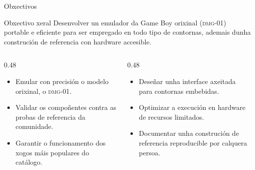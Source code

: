 \begin{frame}{Obxectivos}
  \begin{alertblock}{Obxectivo xeral}
    Desenvolver un emulador da Game Boy orixinal (\textsc{dmg}-01) 
    portable e eficiente para ser empregado en todo tipo de contornas,
    ademais dunha construción de referencia con hardware accesible.
  \end{alertblock}

  \vspace{0.3em}

  \small
  \begin{columns}[t]
    \begin{column}{0.48\textwidth}
      \begin{itemize}
        \item Emular con precisión o modelo orixinal, o \textsc{dmg}-01.
        \item Validar os compoñentes contra as probas de referencia da comunidade.
        \item Garantir o funcionamento dos xogos máis populares do catálogo.
      \end{itemize}
    \end{column}
    \begin{column}{0.48\textwidth}
      \begin{itemize}
        \item Deseñar unha interface axeitada para contornas embebidas.
        \item Optimizar a execución en hardware de recursos limitados.
        \item Documentar unha construción de referencia reproducible por calquera persoa.
      \end{itemize}
    \end{column}
  \end{columns}
\end{frame}
